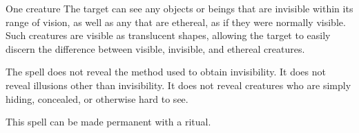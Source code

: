 \begin{spellheader}
    \spelldur{\durlong \dismissable}
\end{spellheader}
\begin{spelleffects}
    \begin{spelltarget}{One creature}
        \spelleffect The target can see any objects or beings that are invisible within its range of vision, as well as any that are ethereal, as if they were normally visible. Such creatures are visible as translucent shapes, allowing the target to easily discern the difference between visible, invisible, and ethereal creatures.
    \end{spelltarget}
\end{spelleffects}
\begin{spellfooter}
    \spellnotes The spell does not reveal the method used to obtain invisibility. It does not reveal illusions other than invisibility. It does not reveal creatures who are simply hiding, concealed, or otherwise hard to see.

    This spell can be made permanent with a  ritual.
\end{spellfooter}

